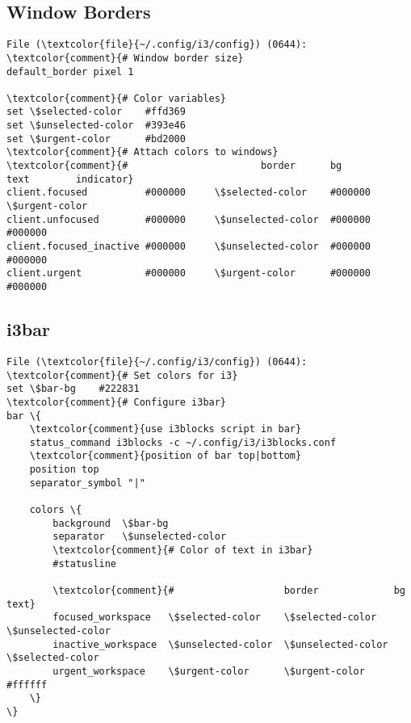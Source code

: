 \documentclass[10pt, a4paper, onecolumn, openany]{book}         %
\begin{document}
\subsection{Window Borders}
\begin{Verbatim}[commandchars=\\\{\}]
File (\textcolor{file}{~/.config/i3/config}) (0644):
\textcolor{comment}{# Window border size}
default_border pixel 1

\textcolor{comment}{# Color variables}
set \$selected-color    #ffd369
set \$unselected-color  #393e46
set \$urgent-color      #bd2000
\textcolor{comment}{# Attach colors to windows}
\textcolor{comment}{#                       border      bg                 text        indicator}
client.focused          #000000     \$selected-color    #000000     \$urgent-color
client.unfocused        #000000     \$unselected-color  #000000     #000000
client.focused_inactive #000000     \$unselected-color  #000000     #000000
client.urgent           #000000     \$urgent-color      #000000     #000000
\end{Verbatim}


\subsection{i3bar}
\begin{Verbatim}[commandchars=\\\{\}]
File (\textcolor{file}{~/.config/i3/config}) (0644):
\textcolor{comment}{# Set colors for i3}
set \$bar-bg    #222831
\textcolor{comment}{# Configure i3bar}
bar \{
    \textcolor{comment}{use i3blocks script in bar}
    status_command i3blocks -c ~/.config/i3/i3blocks.conf
    \textcolor{comment}{position of bar top|bottom}
    position top
    separator_symbol "|"
    
    colors \{
        background  \$bar-bg
        separator   \$unselected-color
        \textcolor{comment}{# Color of text in i3bar}
        #statusline  
        
        \textcolor{comment}{#                   border             bg                 text}
        focused_workspace   \$selected-color    \$selected-color    \$unselected-color
        inactive_workspace  \$unselected-color  \$unselected-color  \$selected-color
        urgent_workspace    \$urgent-color      \$urgent-color      #ffffff
    \}
\}
\end{Verbatim}
\end{document}
